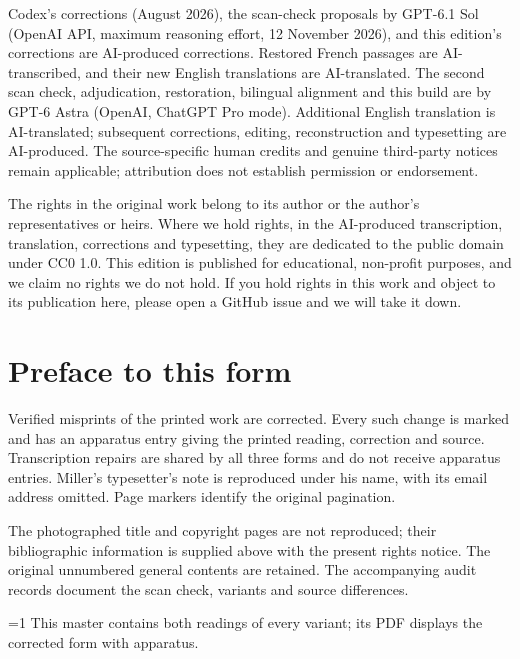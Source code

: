 \documentclass[oneside]{book}
\theoremstyle{sga-source}
\theoremstyle{sga-source-dash}
\theoremstyle{sga-source-dotdash}
\theoremstyle{sga-source-number-note-dash}
\theoremstyle{sga-source-note-number-dotdash}
\theoremstyle{sga-source-example-dotdash}
\theoremstyle{sga-source-inline-number}
\theoremstyle{sga-source-bare-number}
\theoremstyle{sga-source}
\providecommand\EditionIsMaster{0}
\begin{document}
\medskip
Codex’s corrections (August 2026), the scan-check proposals by GPT-6.1 Sol
(OpenAI API, maximum reasoning effort, 12 November 2026), and this edition’s
corrections are AI-produced corrections. Restored French passages are
AI-transcribed, and their new English translations are AI-translated.
The second scan check, adjudication, restoration, bilingual alignment and
this build are by GPT-6 Astra (OpenAI, ChatGPT Pro mode).
Additional English translation is AI-translated; subsequent corrections,
editing, reconstruction and typesetting are AI-produced. The
source-specific human credits and genuine third-party notices remain
applicable; attribution does not establish permission or endorsement.

\medskip
The rights in the original work belong to its author or the author's representatives or heirs.
Where we hold rights, in the AI-produced transcription, translation, corrections and typesetting, they are
dedicated to the public domain under CC0 1.0. This edition is published for educational, non-profit purposes,
and we claim no rights we do not hold. If you hold rights in this work and object to its publication here,
please open a GitHub issue and we will take it down.

\chapter*{Preface to this form}
Verified misprints of the printed work are corrected. Every
such change is marked and has an apparatus entry giving the printed
reading, correction and source. Transcription repairs are shared by all
three forms and do not receive apparatus entries. Miller’s typesetter’s
note is reproduced under his name, with its email address omitted.
Page markers identify the original pagination.

The photographed title and copyright pages are not reproduced; their
bibliographic information is supplied above with the present rights
notice. The original unnumbered general contents are retained. The
accompanying audit records document the scan check, variants and source
differences.

\ifnum\EditionIsMaster=1\relax
This master contains both readings of every variant; its PDF displays the corrected form with apparatus.
\fi

\clearpage

\or
\end{document}
